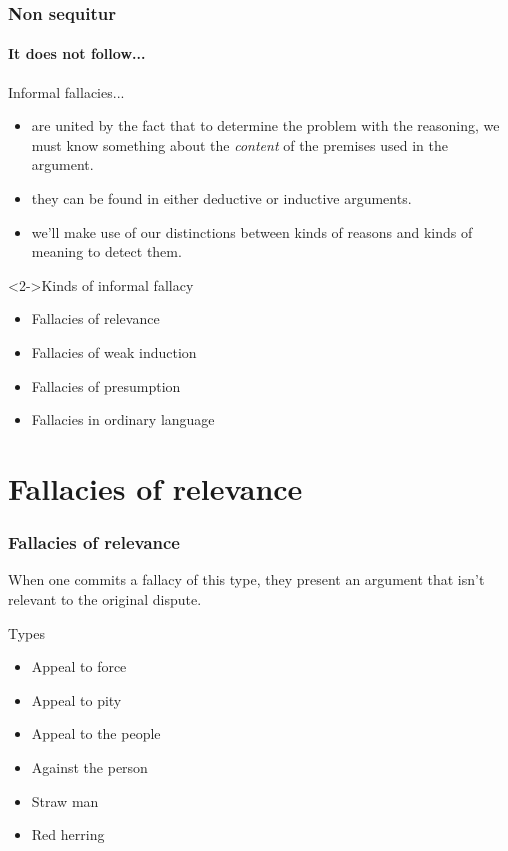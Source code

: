 \documentclass[10pt,letterpaper,xcolor=dvipsnames]{beamer}
\begin{document}
\begin{frame}
\frametitle{Non sequitur}
\framesubtitle{It does not follow...}

\begin{block}{Informal fallacies...}
  \begin{itemize}
    \item are united by the fact that to determine the problem with the reasoning, we must know something about the \textit{content} of the premises used in the argument.
    \item they can be found in either deductive or inductive arguments.
    \item we'll make use of our distinctions between kinds of reasons and kinds of meaning to detect them.
  \end{itemize}
\end{block}
   
\begin{block}<2->{Kinds of informal fallacy}
  \begin{itemize}
    \item Fallacies of relevance
    \item Fallacies of weak induction
    \item Fallacies of presumption
    \item Fallacies in ordinary language
  \end{itemize}
\end{block}

\end{frame}

\section{Fallacies of relevance}

\begin{frame}
\frametitle{Fallacies of relevance}

When one commits a fallacy of this type, they present an argument that isn't relevant to the original dispute.

\begin{block}{Types}
  \begin{itemize}
    \item Appeal to force
    \item Appeal to pity
    \item Appeal to the people
    \item Against the person
    \item Straw man
    \item Red herring
  \end{itemize}
\end{block}

\end{frame}
\end{document}
